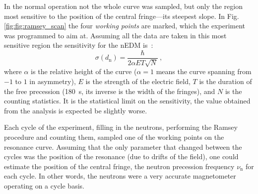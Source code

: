 In the normal operation not the whole curve was sampled, but only the region most sensitive to the position of the central fringe---its steepest slope. In Fig.\,\ref{fig:fig:ramsey_scan} the four \emph{working points} are marked, which the experiment was programmed to aim at. Assuming all the data are taken in this most sensitive region the sensitivity for the nEDM is~\cite{FertlThesis}:
\begin{equation}
  \sigma(d_\text{n}) = \frac{\hbar}{ 2 \alpha E T \sqrt{N} } \ ,
\end{equation}
where $\alpha$ is the relative height of the curve ($\alpha = 1$ means the curve spanning from $-1$ to $1$ in asymmetry), $E$ is the strength of the electric field, $T$ is the duration of the free precession (\SI{180}{\second}, its inverse is the width of the fringes), and $N$ is the counting statistics. It is the statistical limit on the sensitivity, the value obtained from the analysis is expected be slightly worse.

Each cycle of the experiment, filling in the neutrons, performing the Ramsey procedure and counting them, sampled one of the working points on the resonance curve. Assuming that the only parameter that changed between the cycles was the position of the resonance (due to drifts of the field), one could estimate the position of the central fringe, the neutron precession frequency $\nu_\text{n}$ for each cycle. In other words, the neutrons were a very accurate magnetometer operating on a cycle basis.

